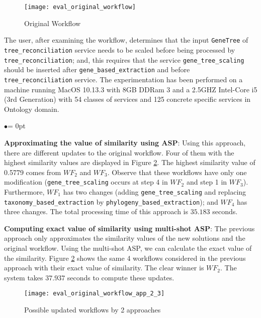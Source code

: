\documentclass{new_tlp}
\begin{document}
\begin{figure}[h]
	\centering	\texttt{[image: eval\_original\_workflow]}
	\caption{Original Workflow \label{eval_original_workflow}}
\end{figure}
%

The user, after examining  the workflow,  determines that the input \texttt{\small GeneTree} of \texttt{\small tree\_reconciliation} service needs to be scaled before being processed by \texttt{\small tree\_reconciliation}; 
and, this requires that the service \texttt{\small gene\_tree\_scaling} should be inserted after \texttt{\small gene\_based\_extraction} and before  \texttt{\small tree\_reconciliation} service. 
The experimentation has been performed on a machine running MacOS 10.13.3 with 8GB DDRam 3 and a 2.5GHZ Intel-Core i5 (3rd Generation)
with 54 classes of services and 125 concrete specific services in Ontology domain. %

\begin{list}{$\bullet$}{\itemsep = 0pt \parsep=1pt \topsep=1pt \leftmargin=10pt}  

\item {\bf Approximating the value of similarity using ASP}: Using this approach, there are different updates to the original workflow. 
Four of them with the highest similarity values are displayed in Figure \ref{eval_original_workflow_app_2_3}. The highest similarity value of 0.5779 comes 
from  \texttt{\small$WF_2$} and \texttt{\small$WF_3$}. Observe that these workflows have only one modification (\texttt{\small gene\_tree\_scaling} 
occurs at step 4 in \texttt{\small$WF_2$} and step 1 in \texttt{\small$WF_3$}). Furthermore, \texttt{\small$WF_1$} has two changes 
(adding \texttt{\small gene\_tree\_scaling} and replacing \texttt{\small taxonomy\_based\_extraction}  by \texttt{\small phylogeny\_based\_extraction}); 
and \texttt{\small$WF_4$} has three changes. The total processing time of this approach is $35.183$ seconds.
 

\item {\bf Computing exact value of similarity using multi-shot ASP}: The previous approach only approximates the similarity values of the new solutions 
and the original workflow. Using the multi-shot ASP, we can calculate the exact value of the similarity. Figure \ref{eval_original_workflow_app_2_3} shows 
the same 4 workflows considered in the previous approach with their exact value of similarity. The clear winner is $WF_2$. The 
system takes $37.937$ seconds to compute these updates.
\begin{figure}[t]
	\centering	\texttt{[image: eval\_original\_workflow\_app\_2\_3]}
	\caption{Possible updated workflows by 2 approaches  \label{eval_original_workflow_app_2_3}}
\end{figure}
\end{list}   
\end{document}

